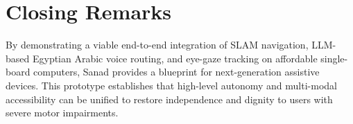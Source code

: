 \section{Closing Remarks}
By demonstrating a viable end-to-end integration of SLAM navigation, LLM-based Egyptian Arabic voice routing, and eye-gaze tracking on affordable single-board computers, Sanad provides a blueprint for next-generation assistive devices. This prototype establishes that high-level autonomy and multi-modal accessibility can be unified to restore independence and dignity to users with severe motor impairments.
